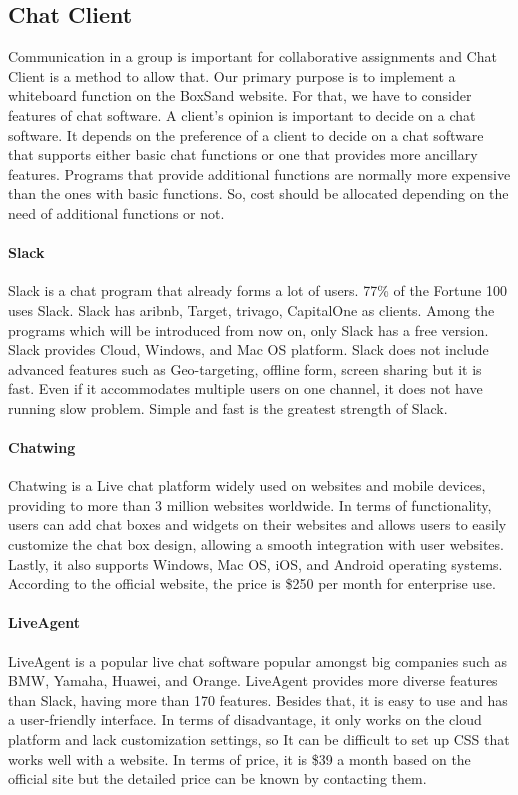 \documentclass[10pt]{article}
\begin{document}
        \subsection{Chat Client}
            Communication in a group is important for collaborative assignments and Chat Client is a method to allow that. Our primary purpose is to implement a whiteboard function on the BoxSand website. For that, we have to consider features of chat software. A client’s opinion is important to decide on a chat software. It depends on the preference of a client to decide on a chat software that supports either basic chat functions or one that provides more ancillary features. Programs that provide additional functions are normally more expensive than the ones with basic functions. So, cost should be allocated depending on the need of additional functions or not.
        
            \paragraph{Slack}
                Slack is a chat program that already forms a lot of users. 77\% of the Fortune 100 uses Slack. Slack has aribnb, Target, trivago, CapitalOne as clients. Among the programs which will be introduced from now on, only Slack has a free version. Slack provides Cloud, Windows, and Mac OS platform. Slack does not include advanced features such as Geo-targeting, offline form, screen sharing but it is fast. Even if it accommodates multiple users on one channel, it does not have running slow problem. Simple and fast is the greatest strength of Slack. 
                
            \paragraph{Chatwing}
                Chatwing is a Live chat platform widely used on websites and mobile devices, providing to more than 3 million websites worldwide. In terms of functionality, users can add chat boxes and widgets on their websites and allows users to easily customize the chat box design, allowing a smooth integration with user websites. Lastly, it also supports Windows, Mac OS, iOS, and Android operating systems. According to the official website, the price is \$250 per month for enterprise use. \cite{Chatwing Price} 
         
             \paragraph{LiveAgent}
                LiveAgent is a popular live chat software popular amongst big companies such as BMW, Yamaha, Huawei, and Orange. LiveAgent provides more diverse features than Slack, having more than 170 features. Besides that, it is easy to use and has a user-friendly interface. In terms of disadvantage, it only works on the cloud platform and lack customization settings, so It can be difficult to set up CSS that works well with a website. In terms of price, it is \$39 a month based on the official site but the detailed price can be known by contacting them. \cite{LiveAgent Price}
            
\end{document}

